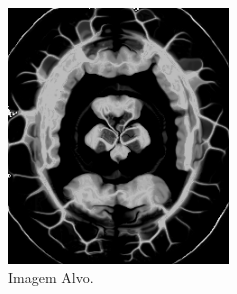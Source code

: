 \documentclass[t]{beamer}
\begin{document}
\begin{frame}
\begin{columns}[c]
\begin{figure}[!h]
\begin{center}
            \includegraphics[width=0.9\textwidth]{../images/resultDistDemons.png}
            \caption{Imagem Alvo.}
          \end{center}
        \end{figure}
    \end{columns}
\end{frame}
\end{document}
